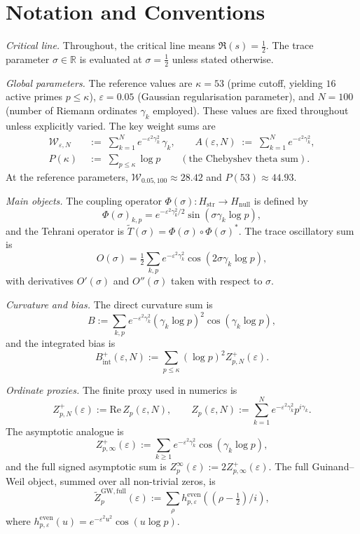 \documentclass[11pt]{article}
\newcommand{\Hstr}{H_{\mathrm{str}}}
\newcommand{\Hnull}{H_{\mathrm{null}}}
\newcommand{\Tt}{\widetilde{T}}
\newcommand{\Wgamma}{\mathcal{W}_{\varepsilon,N}}   %
\begin{document}
\vspace{2em}

\section*{Notation and Conventions}
\label{sec:notation}

\emph{Critical line.}
Throughout, the critical line means $\Re(s)=\tfrac12$.
The trace parameter $\sigma\in\mathbb{R}$ is evaluated at
$\sigma=\tfrac12$ unless stated otherwise.

\medskip
\emph{Global parameters.}
The reference values are $\kappa=53$ (prime cutoff, yielding
$16$ active primes $p\le\kappa$), $\varepsilon=0.05$ (Gaussian
regularisation parameter), and $N=100$ (number of Riemann
ordinates $\gamma_k$ employed).
These values are fixed throughout unless explicitly varied.
The key weight sums are
\begin{align*}
\Wgamma &\;:=\; \sum_{k=1}^N e^{-\varepsilon^2\gamma_k^2}\,\gamma_k,
\qquad
A(\varepsilon,N) \;:=\; \sum_{k=1}^N e^{-\varepsilon^2\gamma_k^2}, \\
P(\kappa) &\;:=\; \sum_{p\le\kappa}\log p
\qquad (\text{the Chebyshev theta sum}).
\end{align*}
At the reference parameters,
$\mathcal{W}_{0.05,100}\approx 28.42$ and $P(53)\approx 44.93$.

\medskip
\emph{Main objects.}
The coupling operator $\Phi(\sigma):\Hstr\to\Hnull$ is defined by
\[
\Phi(\sigma)_{k,p}=e^{-\varepsilon^2\gamma_k^2/2}\sin(\sigma\gamma_k\log p),
\]
and the Tehrani operator is $\Tt(\sigma)=\Phi(\sigma)\circ\Phi(\sigma)^*$.
The trace oscillatory sum is
\[
O(\sigma)=\tfrac12\sum_{k,p}e^{-\varepsilon^2\gamma_k^2}\cos(2\sigma\gamma_k\log p),
\]
with derivatives $O'(\sigma)$ and $O''(\sigma)$ taken with respect to $\sigma$.

\emph{Curvature and bias.}
The direct curvature sum is
\[
B:=\sum_{k,p}e^{-\varepsilon^2\gamma_k^2}(\gamma_k\log p)^2\cos(\gamma_k\log p),
\]
and the integrated bias is
\[
B_{\mathrm{int}}^+(\varepsilon,N):=\sum_{p\le\kappa}(\log p)^2 Z_{p,N}^+(\varepsilon).
\]

\emph{Ordinate proxies.}
The finite proxy used in numerics is
\[
Z_{p,N}^+(\varepsilon):=\mathrm{Re}\,Z_p(\varepsilon,N),
\qquad
Z_p(\varepsilon,N):=\sum_{k=1}^N e^{-\varepsilon^2\gamma_k^2}p^{i\gamma_k}.
\]
The asymptotic analogue is
\[
Z_{p,\infty}^+(\varepsilon):=\sum_{k\ge 1}e^{-\varepsilon^2\gamma_k^2}\cos(\gamma_k\log p),
\]
and the full signed asymptotic sum is
$Z_p^\infty(\varepsilon):=2Z_{p,\infty}^+(\varepsilon)$.
The full Guinand--Weil object, summed over all non-trivial zeros, is
\[
\widetilde Z_p^{\mathrm{GW,full}}(\varepsilon)
:=\sum_\rho h^{\mathrm{even}}_{p,\varepsilon}((\rho-\tfrac12)/i),
\]
where $h^{\mathrm{even}}_{p,\varepsilon}(u)=e^{-\varepsilon^2 u^2}\cos(u\log p)$.
\end{document}
